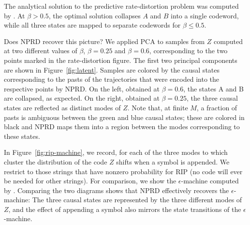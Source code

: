 \documentclass[11pt,letterpaper]{article}
\begin{document}
The analytical solution to the predictive rate-distortion problem was computed by \cite{marzen-predictive-2016}.
At $\beta > 0.5$, the optimal solution collapses $A$ and $B$ into a single codeword, while all three states are mapped to separate codewords for $\beta \leq 0.5$.


Does NPRD recover this picture?
We applied PCA to samples from $Z$ computed at two different values of $\beta$, $\beta = 0.25$ and $\beta = 0.6$, corresponding to the two points marked in the rate-distortion figure.
The first two principal components are shown in Figure~\ref{fig:latent}.
Samples are colored by the causal states corresponding to the pasts of the trajectories that were encoded into the respective points by NPRD.
On the left, obtained at $\beta=0.6$, the states A and B are collapsed, as expected.
On the right, obtained at $\beta=0.25$, the three causal states are reflected as distinct modes of $Z$.
Note that, at finite $M$, a fraction of pasts is ambiguous between the green and blue causal states; these are colored in black and NPRD maps them into a region between the modes corresponding to these states.

In Figure~\ref{fig:rip-machine}, we record, for each of the three modes to which cluster the distribution of the code $Z$ shifts when a symbol is appended.
We restrict to those strings that have nonzero probability for RIP (no code will ever be needed for other strings).
For comparison, we show the $\epsilon$-machine computed by \cite{marzen-predictive-2016}.
Comparing the two diagrams shows that NPRD effectively recovers the $\epsilon$-machine:
The three causal states are represented by the three different modes of $Z$, and the effect of appending a symbol also mirrors the state transitions of the $\epsilon$-machine.
\end{document}
